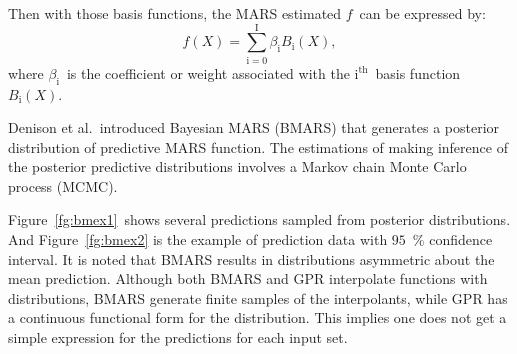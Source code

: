 \documentclass[review]{elsarticle}
\begin{document}
Then with those basis functions, the MARS estimated $f$~can be expressed by:
\begin{equation}
f(X)=\sum\limits_{\mathrm{i}=0}^{\mathrm{I}}\beta_\mathrm{i}B_\mathrm{i}(X),
\end{equation}
where $\beta_\mathrm{i}$\ is the coefficient or weight associated with the $\mathrm{i^{th}}$\ basis function $B_\mathrm{i}(X)$\cite{bmars_mcc2,stripbmars}.

Denison et al.~introduced Bayesian  MARS (BMARS) that generates a posterior distribution of predictive MARS function\cite{malick}. The estimations of making inference of the posterior predictive distributions involves a Markov chain Monte Carlo process (MCMC).

Figure~\ref{fg:bmex1}~shows several predictions sampled from posterior distributions. And Figure~\ref{fg:bmex2} is the example of prediction data with $95$~\% confidence interval. It is noted that BMARS results in distributions asymmetric about the mean prediction. Although both BMARS and GPR interpolate functions with distributions, BMARS generate finite samples of the interpolants, while GPR has a continuous functional form for the distribution. This implies one does not get a simple expression for the predictions for each input set.
\end{document}

